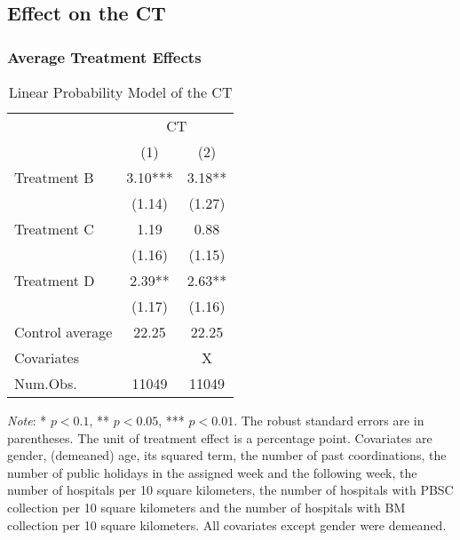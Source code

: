 \documentclass[12pt, a4paper]{article}
\begin{document}
\hypertarget{effect-on-the-ct}{%
\subsection{Effect on the CT}\label{effect-on-the-ct}}

\hypertarget{average-treatment-effects}{%
\subsubsection{Average Treatment Effects}\label{average-treatment-effects}}

\begin{table}[H]

\caption{\label{tab:lm-test}Linear Probability Model of the CT}
\centering
\fontsize{8}{10}\selectfont
\begin{threeparttable}
\begin{tabular}[t]{>{\raggedright\arraybackslash}p{20em}cc}
\toprule
\multicolumn{1}{c}{ } & \multicolumn{2}{c}{CT} \\
\cmidrule(l{3pt}r{3pt}){2-3}
  & (1) & (2)\\
\midrule
Treatment B & \num{3.10}*** & \num{3.18}**\\
 & (\num{1.14}) & (\num{1.27})\\
Treatment C & \num{1.19} & \num{0.88}\\
 & (\num{1.16}) & (\num{1.15})\\
Treatment D & \num{2.39}** & \num{2.63}**\\
 & (\num{1.17}) & (\num{1.16})\\
\midrule
Control average & 22.25 & 22.25\\
Covariates &  & X\\
Num.Obs. & \num{11049} & \num{11049}\\
\bottomrule
\end{tabular}
\begin{tablenotes}
\item \emph{Note}: * $p < 0.1$, ** $p < 0.05$, *** $p < 0.01$. The robust standard errors are in parentheses. The unit of treatment effect is a percentage point. Covariates are gender, (demeaned) age, its squared term, the number of past coordinations, the number of public holidays in the assigned week and the following week, the number of hospitals per 10 square kilometers, the number of hospitals with PBSC collection per 10 square kilometers and the number of hospitals with BM collection per 10 square kilometers. All covariates except gender were demeaned.
\end{tablenotes}
\end{threeparttable}
\end{table}
\end{document}
